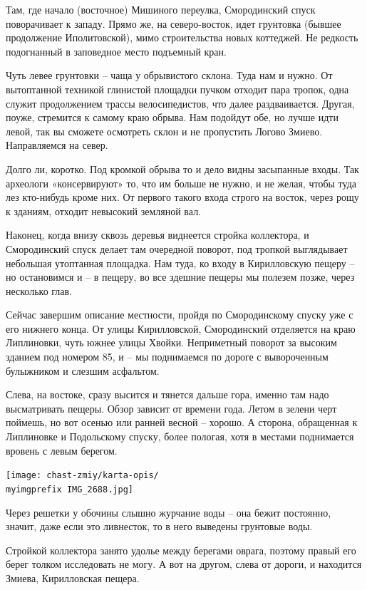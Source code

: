 Там, где начало (восточное) Мишиного переулка, Смородинский спуск поворачивает к западу. Прямо же, на северо-восток, идет грунтовка (бывшее продолжение Иполитовской), мимо строительства новых коттеджей. Не редкость подогнанный в заповедное место подъемный кран.

Чуть левее грунтовки – чаща у обрывистого склона. Туда нам и нужно. От вытоптанной техникой глинистой площадки пучком отходит пара тропок, одна служит продолжением трассы велосипедистов, что далее раздваивается. Другая, поуже, стремится к самому краю обрыва. Нам подойдут обе, но лучше идти левой, так вы сможете осмотреть склон и не пропустить Логово Змиево. Направляемся на север. 

Долго ли, коротко. Под кромкой обрыва то и дело видны засыпанные входы. Так археологи «консервируют» то, что им больше не нужно, и не желая, чтобы туда лез кто-нибудь кроме них. От первого такого входа строго на восток, через рощу к зданиям, отходит невысокий земляной вал. 

Наконец, когда внизу сквозь деревья виднеется стройка коллектора, и Смородинский спуск делает там очередной поворот, под тропкой выглядывает небольшая утоптанная площадка. Нам туда, ко входу в Кирилловскую пещеру – но остановимся и – в пещеру, во все здешние пещеры мы полезем позже, через несколько глав.

Сейчас завершим описание местности, пройдя по Смородинскому спуску уже с его нижнего конца. От улицы Кирилловской, Смородинский отделяется на краю Липлиновки, чуть южнее улицы Хвойки. Неприметный поворот за высоким зданием под номером 85, и – мы поднимаемся по дороге с вывороченным булыжником и слезшим асфальтом.

Слева, на востоке, сразу высится и тянется дальше гора, именно там надо высматривать пещеры. Обзор зависит от времени года. Летом в зелени черт поймешь, но вот осенью или ранней весной – хорошо. А сторона, обращенная к Липлиновке и Подольскому спуску, более пологая, хотя в местами поднимается вровень с левым берегом.

\begin{center}
\texttt{[image: chast-zmiy/karta-opis/\\myimgprefix IMG\_2688.jpg]}
\end{center}

Через решетки у обочины слышно журчание воды – она бежит постоянно, значит, даже если это ливнесток, то в него выведены грунтовые воды.

Стройкой коллектора занято удолье между берегами оврага, поэтому правый его берег толком исследовать не могу. А вот на другом, слева от дороги, и находится Змиева, Кирилловская пещера. 

